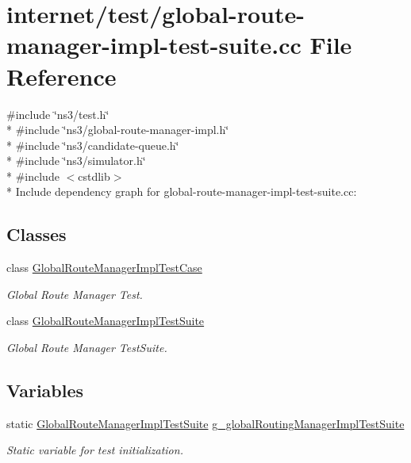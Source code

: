 \hypertarget{global-route-manager-impl-test-suite_8cc}{}\section{internet/test/global-\/route-\/manager-\/impl-\/test-\/suite.cc File Reference}
\label{global-route-manager-impl-test-suite_8cc}
{\ttfamily \#include \char`\"{}ns3/test.\+h\char`\"{}}\\*
{\ttfamily \#include \char`\"{}ns3/global-\/route-\/manager-\/impl.\+h\char`\"{}}\\*
{\ttfamily \#include \char`\"{}ns3/candidate-\/queue.\+h\char`\"{}}\\*
{\ttfamily \#include \char`\"{}ns3/simulator.\+h\char`\"{}}\\*
{\ttfamily \#include $<$cstdlib$>$}\\*
Include dependency graph for global-\/route-\/manager-\/impl-\/test-\/suite.cc\+:
\subsection*{Classes}
\begin{DoxyCompactItemize}
\item 
class \hyperlink{classGlobalRouteManagerImplTestCase}{Global\+Route\+Manager\+Impl\+Test\+Case}
\begin{DoxyCompactList}\small\item\em Global Route Manager Test. \end{DoxyCompactList}\item 
class \hyperlink{classGlobalRouteManagerImplTestSuite}{Global\+Route\+Manager\+Impl\+Test\+Suite}
\begin{DoxyCompactList}\small\item\em Global Route Manager Test\+Suite. \end{DoxyCompactList}\end{DoxyCompactItemize}
\subsection*{Variables}
\begin{DoxyCompactItemize}
\item 
static \hyperlink{classGlobalRouteManagerImplTestSuite}{Global\+Route\+Manager\+Impl\+Test\+Suite} \hyperlink{global-route-manager-impl-test-suite_8cc_a92397e1f955177ca84fb0935ab80a763}{g\+\_\+global\+Routing\+Manager\+Impl\+Test\+Suite}
\begin{DoxyCompactList}\small\item\em Static variable for test initialization. \end{DoxyCompactList}\end{DoxyCompactItemize}



